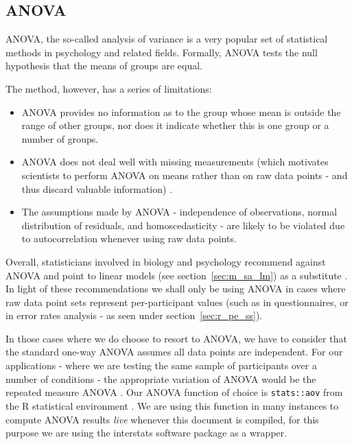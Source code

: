 	\subsection{ANOVA}\label{sec:m_sa_a}
	    ANOVA, the so-called analysis of variance is a very popular set of statistical methods in psychology and related fields.
	    Formally, ANOVA tests the null hypothesis that the means of groups are equal.
	    
	    The method, however, has a series of limitations:
	    \begin{itemize}
		\item ANOVA provides no information as to the group whose mean is outside the range of other groups, nor does it indicate whether this is one group or a number of groups.
		\item ANOVA does not deal well with missing measurements (which motivates scientists to perform ANOVA on means rather than on raw data points - and thus discard valuable information) \cite{Gueorguieva2004}.
		\item The assumptions made by ANOVA - independence of observations, normal distribution of residuals, and homoscedasticity \cite{Anderson1996} - are likely to be violated due to autocorrelation whenever using raw data points. 
	    \end{itemize}
	    Overall, statisticians involved in biology and psychology recommend against ANOVA and point to linear models (see section~\ref{sec:m_sa_lm}) as a substitute \cite{Baayen2008,Gueorguieva2004}. 
	    In light of these recommendations we shall only be using ANOVA in cases where raw data point sets represent per-participant values 
	    (such as in questionnaires, or in error rates analysis - as seen under section~\ref{sec:r_pe_ss}).
	    
	    In those cases where we do choose to resort to ANOVA, we have to consider that the standard one-way ANOVA assumes all data points are independent.
	    For our applications - where we are testing the same sample of participants over a number of conditions - the appropriate variation of ANOVA would be the repeated measure ANOVA \cite{Gueorguieva2004}.
	    Our ANOVA function of choice is \colorbox{vlg}{\texttt{stats::aov}} \cite{Chambers1992} from the R statistical environment \cite{R}.
	    We are using this function in many instances to compute ANOVA results \textit{live} whenever this document is compiled, for this purpose we are using the interstats \cite{interstats} software package as a wrapper.
	    
